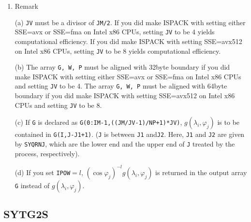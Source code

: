\documentclass[a4paper]{scrartcl}
\begin{document}
\begin{enumerate}
\item Remark

(a) \texttt{JV} must be a divisor of \texttt{JM/2}.
If you did make ISPACK with setting either SSE=avx or SSE=fma
on Intel x86 CPUs,
setting \texttt{JV} to be 4 yields computational efficiency.
If you did make ISPACK with setting SSE=avx512
on Intel x86 CPUs,
setting \texttt{JV} to be 8 yields computational efficiency.

(b) 
The array \texttt{G, W, P} must be aligned with 32byte boundary
if you did make ISPACK with setting either SSE=avx or SSE=fma
on Intel x86 CPUs and setting \texttt{JV} to be 4.
The array \texttt{G, W, P} must be aligned with 64byte boundary
if you did make ISPACK with setting SSE=avx512
on Intel x86 CPUs and setting \texttt{JV} to be 8.

(c) If \texttt{G} is declared as 
\texttt{G(0:IM-1,((JM/JV-1)/NP+1)*JV)},
    $g(\lambda_i,\varphi_j)$ is to be contained in \texttt{G(I,J-J1+1)}.
(\texttt{J} is between \texttt{J1} and\texttt{J2}. Here, 
\texttt{J1} and \texttt{J2} are given by \texttt{SYQRNJ},
which are the lower end and the upper end of \texttt{J} treated 
by the process, respectively).
  
(d) If you set \texttt{IPOW}$=l$, 
$(\cos\varphi_j)^{-l}g(\lambda_i,\varphi_j)$ is returned 
in the output array \texttt{G} instead of $g(\lambda_i,\varphi_j)$.

\end{enumerate}


\subsection{SYTG2S}
\end{document}
